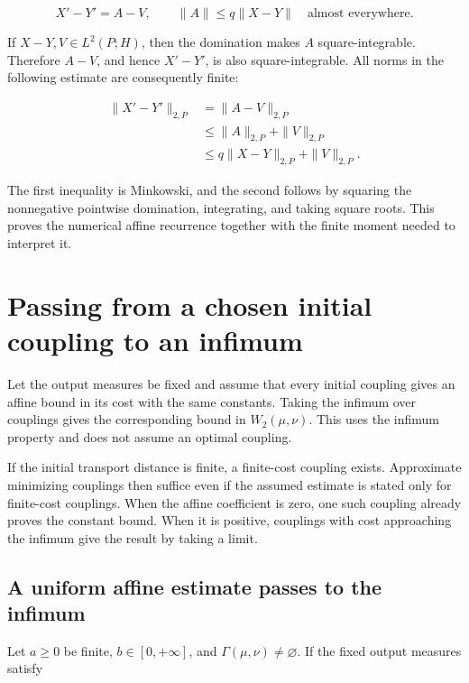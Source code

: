 \documentclass[11pt,a4paper]{report}
\begin{document}
\[X'-Y'=A-V,\qquad\|A\|\le q\|X-Y\|\quad\text{almost everywhere}.\]


If \(X-Y,V\in L^2(P;H)\), then the domination makes \(A\) square-integrable. Therefore \(A-V\), and hence \(X'-Y'\), is also square-integrable. All norms in the following estimate are consequently finite:

\[\begin{aligned}
\|X'-Y'\|_{2,P}&=\|A-V\|_{2,P}\\
&\le\|A\|_{2,P}+\|V\|_{2,P}\\
&\le q\|X-Y\|_{2,P}+\|V\|_{2,P}.
\end{aligned}\]


The first inequality is Minkowski, and the second follows by squaring the nonnegative pointwise domination, integrating, and taking square roots. This proves the numerical affine recurrence together with the finite moment needed to interpret it.

\section{\texorpdfstring{Passing from a chosen initial coupling to an infimum}{Passing from a chosen initial coupling to an infimum}}
\label{proof-module-UnadjustedLangevin-InitialCoupling-lean}


Let the output measures be fixed and assume that every initial coupling gives an affine bound in its cost with the same constants. Taking the infimum over couplings gives the corresponding bound in \(W_2(\mu,\nu)\). This uses the infimum property and does not assume an optimal coupling.



If the initial transport distance is finite, a finite-cost coupling exists. Approximate minimizing couplings then suffice even if the assumed estimate is stated only for finite-cost couplings. When the affine coefficient is zero, one such coupling already proves the constant bound. When it is positive, couplings with cost approaching the infimum give the result by taking a limit.

\subsection{\texorpdfstring{A uniform affine estimate passes to the infimum}{A uniform affine estimate passes to the infimum}}
\label{report-step-UnadjustedLangevin-InitialCoupling-lean-1}


Let \(a\ge0\) be finite, \(b\in[0,+\infty]\), and \(\Gamma(\mu,\nu)\ne\varnothing\). If the fixed output measures satisfy
\end{document}
